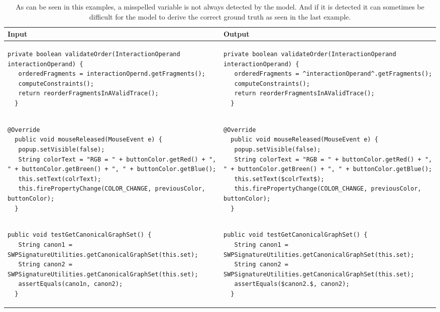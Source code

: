 \begin{landscape}
\begin{table}[p]
\begin{tabular}{ | m{10cm} | m{10cm} | }
  \hline
  Input & Output \\
  \hline
  {\begin{lstlisting}[style=table]
  private boolean validateOrder(InteractionOperand interactionOperand) {
   orderedFragments = interactionOpernd.getFragments();
   computeConstraints();
   return reorderFragmentsInAValidTrace();
  }
  \end{lstlisting}} &
  {\begin{lstlisting}[style=table]
  private boolean validateOrder(InteractionOperand interactionOperand) {
   orderedFragments = ^interactionOperand^.getFragments();
   computeConstraints();
   return reorderFragmentsInAValidTrace();
  }
  \end{lstlisting}} \\
  \hline
  {\begin{lstlisting}[style=table]
  @Override
  public void mouseReleased(MouseEvent e) {
   popup.setVisible(false);
   String colorText = "RGB = " + buttonColor.getRed() + ", " + buttonColor.getBreen() + ", " + buttonColor.getBlue();
   this.setText(colrText);
   this.firePropertyChange(COLOR_CHANGE, previousColor, buttonColor);
  }
  \end{lstlisting}} &
  {\begin{lstlisting}[style=table]
  @Override
  public void mouseReleased(MouseEvent e) {
   popup.setVisible(false);
   String colorText = "RGB = " + buttonColor.getRed() + ", " + buttonColor.getBreen() + ", " + buttonColor.getBlue();
   this.setText($colrText$);
   this.firePropertyChange(COLOR_CHANGE, previousColor, buttonColor);
  }
  \end{lstlisting}} \\
  \hline
  {\begin{lstlisting}[style=table]
  public void testGetCanonicalGraphSet() {
   String canon1 = SWPSignatureUtilities.getCanonicalGraphSet(this.set);
   String canon2 = SWPSignatureUtilities.getCanonicalGraphSet(this.set);
   assertEquals(cano1n, canon2);
  }
  \end{lstlisting}} &
  {\begin{lstlisting}[style=table]
  public void testGetCanonicalGraphSet() {
   String canon1 = SWPSignatureUtilities.getCanonicalGraphSet(this.set);
   String canon2 = SWPSignatureUtilities.getCanonicalGraphSet(this.set);
   assertEquals($canon2.$, canon2);
  }
  \end{lstlisting}} \\
  \hline
\end{tabular}
\caption{As can be seen in this examples, a misspelled variable is not always detected by the model. And if it is detected it can sometimes be difficult for the model to derive the correct ground truth as seen in the last example.}
\label{variable_showcase_table}
\end{table}


\end{landscape}
